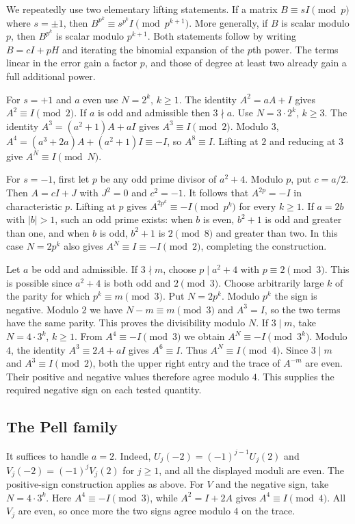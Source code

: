 \documentclass[11pt,a4paper]{article}
\theoremstyle{remark}\newtheorem{remark}[theorem]{Remark}
\numberwithin{equation}{section}
\begin{document}
We repeatedly use two elementary lifting statements. If a matrix
$B\equiv sI\pmod p$ where $s=\pm1$, then
$B^{p^k}\equiv s^{p^k}I\pmod{p^{k+1}}$. More generally, if $B$ is
scalar modulo $p$, then $B^{p^k}$ is scalar modulo $p^{k+1}$.
Both statements follow by writing $B=cI+pH$ and iterating the binomial
expansion of the $p$th power. The terms linear in the error gain a
factor $p$, and those of degree at least two already gain a full
additional power.

For $s=+1$ and $a$ even use $N=2^k$, $k\ge1$.
The identity $A^2=aA+I$ gives $A^2\equiv I\pmod2$.
If $a$ is odd and admissible then $3\nmid a$. Use $N=3\cdot2^k$,
$k\ge3$. The identity $A^3=(a^2+1)A+aI$ gives $A^3\equiv I\pmod2$.
Modulo $3$, $A^4=(a^3+2a)A+(a^2+1)I\equiv-I$, so $A^8\equiv I$.
Lifting at $2$ and reducing at $3$ give $A^N\equiv I\pmod N$.

For $s=-1$, first let $p$ be any odd prime divisor of $a^2+4$.
Modulo $p$, put $c=a/2$. Then $A=cI+J$ with $J^2=0$ and $c^2=-1$.
It follows that $A^{2p}=-I$ in characteristic $p$.
Lifting at $p$ gives $A^{2p^k}\equiv-I\pmod{p^k}$ for every $k\ge1$.
If $a=2b$ with $|b|>1$, such an odd prime exists: when $b$ is even,
$b^2+1$ is odd and greater than one, and when $b$ is odd, $b^2+1$ is
$2\pmod8$ and greater than two. In this case $N=2p^k$ also gives
$A^N\equiv I\equiv-I\pmod2$, completing the construction.

Let $a$ be odd and admissible. If $3\nmid m$, choose $p\mid a^2+4$
with $p\equiv2\pmod3$. This is possible since $a^2+4$ is both odd
and $2\pmod3$. Choose arbitrarily large $k$ of the parity for which
$p^k\equiv m\pmod3$. Put $N=2p^k$. Modulo $p^k$ the sign is negative.
Modulo $2$ we have $N-m\equiv m\pmod3$ and $A^3=I$, so the two
terms have the same parity. This proves the divisibility modulo $N$.
If $3\mid m$, take $N=4\cdot3^k$, $k\ge1$. From $A^4\equiv-I\pmod3$
we obtain $A^N\equiv-I\pmod{3^k}$. Modulo $4$, the identity
$A^3\equiv2A+aI$ gives $A^6\equiv I$. Thus $A^N\equiv I\pmod4$.
Since $3\mid m$ and $A^3\equiv I\pmod2$, both the upper right entry
and the trace of $A^{-m}$ are even. Their positive and negative values
therefore agree modulo $4$. This supplies the required negative sign
on each tested quantity.

\subsection{The Pell family}

It suffices to handle $a=2$. Indeed,
$U_j(-2)=(-1)^{j-1}U_j(2)$ and $V_j(-2)=(-1)^jV_j(2)$ for $j\ge1$,
and all the displayed moduli are even. The positive-sign construction
applies as above. For $V$ and the negative sign, take $N=4\cdot3^k$.
Here $A^4\equiv-I\pmod3$, while $A^2=I+2A$ gives $A^4\equiv I\pmod4$.
All $V_j$ are even, so once more the two signs agree modulo $4$ on the
trace.
\end{document}
